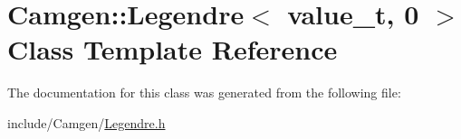 \hypertarget{a00324}{}\section{Camgen\+:\+:Legendre$<$ value\+\_\+t, 0 $>$ Class Template Reference}
\label{a00324}


The documentation for this class was generated from the following file\+:\begin{DoxyCompactItemize}
\item 
include/\+Camgen/\hyperlink{a00677}{Legendre.\+h}\end{DoxyCompactItemize}
